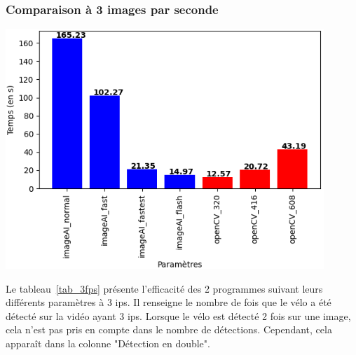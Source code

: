 \subsubsection{Comparaison à 3 images par seconde}
\label{sec:comparaisonIA:resultats:3fps}

\begin{center}
    \centering
    \includegraphics[width=0.9\textwidth]{img/result_3fps.png}
\end{center}

Le tableau~\ref{tab_3fps} présente l'efficacité des 2 programmes suivant leurs différents paramètres à 3 ips.
Il renseigne le nombre de fois que le vélo a été détecté sur la vidéo ayant 3 ips.
Lorsque le vélo est détecté 2 fois sur une image, cela n'est pas pris en compte dans le nombre de détections.
Cependant, cela apparaît dans la colonne "Détection en double".


